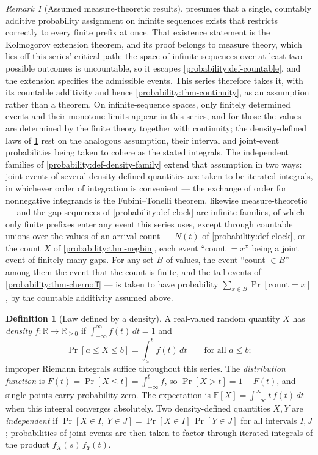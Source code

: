 \documentclass[11pt,a4paper]{article}
\theoremstyle{definition}
\newtheorem{definition}[theorem]{Definition}
\theoremstyle{remark}
\newtheorem{remark}[theorem]{Remark}
\newcommand{\R}{\ensuremath{\mathbb{R}}}
\newcommand{\E}{\ensuremath{\mathbb{E}}}
\begin{document}
\begin{remark}[Assumed measure-theoretic results]\label{probability:rem-extension}
 presumes that a single, countably
additive probability assignment on infinite sequences exists that
restricts correctly to every finite prefix at once. That existence
statement is the Kolmogorov extension theorem, and its proof belongs
to measure theory, which lies off this series' critical path: the
space of infinite sequences over at least two possible outcomes is
uncountable, so it escapes \cref{probability:def-countable}, and the
extension specifies the admissible events. This series therefore takes
it, with its countable additivity and hence
\cref{probability:thm-continuity}, as an assumption rather than a
theorem. On infinite-sequence spaces, only finitely determined events
and their monotone limits appear in this series, and for those the
values are determined by the finite theory together with continuity;
the density-defined laws of \cref{probability:def-density} rest on the
analogous assumption, their interval and joint-event probabilities
being taken to cohere as the stated integrals. The independent
families of \cref{probability:def-density-family} extend that
assumption in two ways:
joint events of several density-defined quantities are taken to be
iterated integrals, in whichever order of integration is convenient
--- the exchange of order for nonnegative integrands is the
Fubini--Tonelli theorem, likewise measure-theoretic --- and the gap
sequences of \cref{probability:def-clock} are infinite families, of
which only finite prefixes enter any event this series uses, except
through countable unions over the values of an arrival count ---
\(N(t)\) of \cref{probability:def-clock}, or the count \(X\) of
\cref{probability:thm-negbin}, each event ``count \(= x\)'' being a
joint event of finitely many gaps. For any set \(B\) of values, the
event ``count \(\in B\)'' --- among them the event that the count is
finite, and the tail events of \cref{probability:thm-chernoff} --- is
taken to have probability \(\sum_{x \in B} \Pr[\text{count} = x]\),
by the countable additivity assumed above.
\end{remark}

\begin{definition}[Law defined by a density]
\label{probability:def-density}
A real-valued random quantity \(X\) has \emph{density}
\(f\colon \R \to \R_{\ge 0}\) if
\(\int_{-\infty}^{\infty} f(t)\,dt = 1\) and
\[
\Pr[a \le X \le b] = \int_a^b f(t)\,dt
\qquad \text{for all } a \le b;
\]
improper Riemann integrals suffice throughout this series. The
\emph{distribution function} is
\(F(t) = \Pr[X \le t] = \int_{-\infty}^{t} f\), so
\(\Pr[X > t] = 1 - F(t)\), and single points carry probability zero.
The expectation is \(\E[X] = \int_{-\infty}^{\infty} t\,f(t)\,dt\)
when this integral converges absolutely. Two density-defined
quantities \(X, Y\) are \emph{independent} if
\(\Pr[X \in I,\ Y \in J] = \Pr[X \in I]\,\Pr[Y \in J]\) for all
intervals \(I, J\); probabilities of joint events are then taken to
factor through iterated integrals of the product
\(f_X(s)\,f_Y(t)\).
\end{definition}
\end{document}
